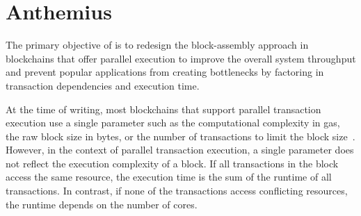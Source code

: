 \section{Anthemius}
\label{sec:overview}

The primary objective of \sys is to redesign the block-assembly approach in blockchains that offer parallel execution to improve the overall system throughput and prevent popular applications from creating bottlenecks by factoring in transaction dependencies and execution time.

At the time of writing, most blockchains that support parallel transaction execution use a single parameter such as the computational complexity in gas, the raw block size in bytes, or the number of transactions to limit the block size~\cite{aptos,sui,solana}. However, in the context of parallel transaction execution, a single parameter does not reflect the execution complexity of a block. If all transactions in the block access the same resource, the execution time is the sum of the runtime of all transactions. In contrast, if none of the transactions access conflicting resources, the runtime depends on the number of cores.




